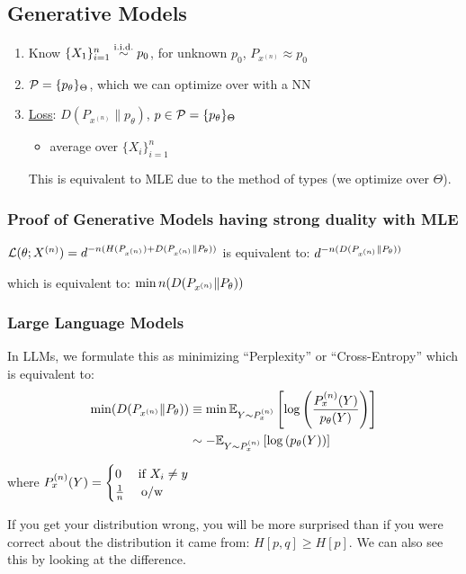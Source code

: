 \subsection{Generative Models}
\begin{enumerate}
    \item Know $\{X_1\}_{i=1}^n\overset{\text{i.i.d.}}{\sim} p_0$, for unknown $p_0$, $P_{x^{(n)}} \approx p_0$
    \item $\mathcal{P}=\{p_\theta\}_\Theta$, which we can optimize over with a NN
    \item \underline{Loss}: $D(P_{x^{(n)}}\|p_\theta)$, $p\in\mathcal{P}=\{p_\theta\}_\Theta$
    \begin{itemize}
        \item average over $\{X_i\}_{i=1}^n$
    \end{itemize}
\vspace{0.4em}
This is equivalent to MLE due to the method of types (we optimize over $\Theta$).
\end{enumerate}

\subsubsection{Proof of Generative Models having strong duality with MLE}
$
\mathcal{L}(\theta; X^{(n)}) = d^{-n(H(P_{x^{(n)}}) + D(P_{x^{(n)}} \| P_\theta))}
$
is equivalent to: 
$
d^{-n(D(P_{x^{(n)}} \| P_\theta))}
$

which is equivalent to: 
$
\min n(D(P_{x^{(n)}} \| P_\theta))
$

\subsubsection{Large Language Models}
In LLMs, we formulate this as minimizing ``Perplexity'' or ``Cross-Entropy'' 
which is equivalent to: 
\begin{align*}
\min (D(P_{x^{(n)}} \| P_\theta)) 
&\equiv \min \mathbb{E}_{Y\sim P_x^{(n)}}\left[
\log\left(
\frac{P_x^{(n)}(Y)}{p_\theta(Y)}
\right)
\right]
\\
&\sim -\mathbb{E}_{Y\sim P_x^{(n)}}\left[
\log\left(
{p_\theta(Y)}
\right)
\right]
\end{align*}

where ${P_x^{(n)}(Y)}=\begin{cases}
    0 \quad\text{ if } X_i\neq y\\
    \frac1n \quad\text{ o/w}
\end{cases}$

If you get your distribution wrong, you will be more surprised than if you were correct about the distribution it came from: $H[p, q]\geq H[p]$. We can also see this by looking at the difference.
